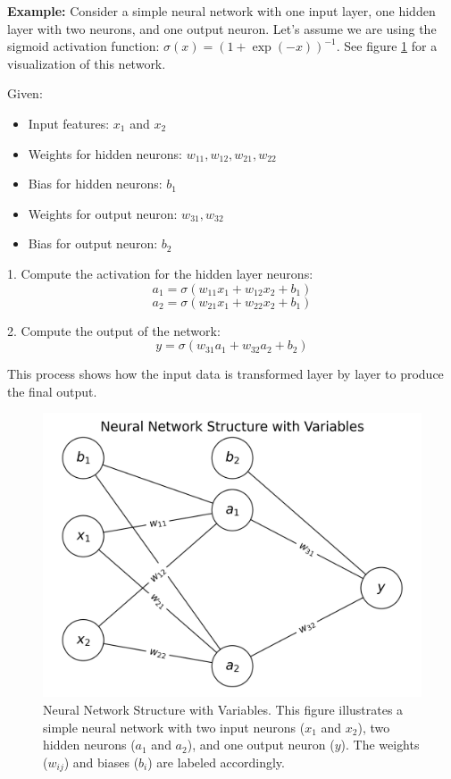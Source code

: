 \documentclass[english,11pt,a4paper,titlepage]{article}
\begin{document}
	\textbf{Example:}
	Consider a simple neural network with one input layer, one hidden layer with two neurons, and one output neuron. Let's assume we are using the sigmoid activation function: \( \sigma(x) = (1 + \exp(-x))^{-1} \). See figure \ref{fig:nn_feedforward} for a visualization of this network.
	
	Given:
	\begin{itemize}
		\item Input features: \( x_1 \) and \( x_2 \)
		\item Weights for hidden neurons: \( w_{11}, w_{12}, w_{21}, w_{22} \)
		\item Bias for hidden neurons: \( b_1 \)
		\item Weights for output neuron: \( w_{31}, w_{32} \)
		\item Bias for output neuron: \( b_2 \)
	\end{itemize}
	
	1. Compute the activation for the hidden layer neurons:
	\begin{equation*}
		a_1 = \sigma (w_{11} x_1 + w_{12} x_2 + b_1)
	\end{equation*}
	\begin{equation*}
		a_2 = \sigma (w_{21} x_1 + w_{22} x_2 + b_1)
	\end{equation*}
	
	2. Compute the output of the network:
	\begin{equation*}
		y = \sigma (w_{31} a_1 + w_{32} a_2 + b_2)
	\end{equation*}
	
	This process shows how the input data is transformed layer by layer to produce the final output.
	
	\begin{figure}[h]
		\centering
		\includegraphics[width=0.8\linewidth]{img/nn_feedforward.png}
		\caption{Neural Network Structure with Variables. This figure illustrates a simple neural network with two input neurons (\( x_1 \) and \( x_2 \)), two hidden neurons (\( a_1 \) and \( a_2 \)), and one output neuron (\( y \)). The weights (\( w_{ij} \)) and biases (\( b_i \)) are labeled accordingly.}
		\label{fig:nn_feedforward}
	\end{figure}
	
\end{document}
